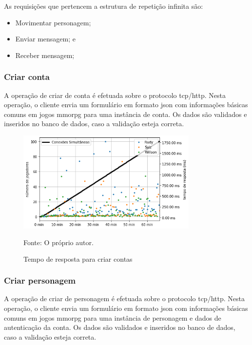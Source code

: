 As requisições que pertencem a estrutura de repetição infinita são:

\begin{itemize}
    \item Movimentar personagem;
    \item Enviar mensagem; e
    \item Receber mensagem;
\end{itemize}


\subsubsection{Criar conta}

A operação de criar de conta é efetuada sobre o protocolo \ac{tcp}/\ac{http}.
%
Nesta operação, o cliente envia um formulário em formato \ac{json} com informações básicas comuns em jogos \ac{mmorpg} para uma instância de conta.
%
Os dados são validados e inseridos no banco de dados, caso a validação esteja correta.

\begin{figure}[htb!]
  \caption{Tempo de resposta para criar contas}
  \label{fig:create_account_operation_request_time}
  \includegraphics[width=0.8\textwidth]{figuras/analise/rt/create_account_operation_request_time.png}
  \centering

  Fonte: O próprio autor.
\end{figure}

\subsubsection{Criar personagem}

A operação de criar de personagem é efetuada sobre o protocolo \ac{tcp}/\ac{http}.
%
Nesta operação, o cliente envia um formulário em formato \ac{json} com informações básicas comuns em jogos \ac{mmorpg} para uma instância de personagem e dados de autenticação da conta.
%
Os dados são validados e inseridos no banco de dados, caso a validação esteja correta.

